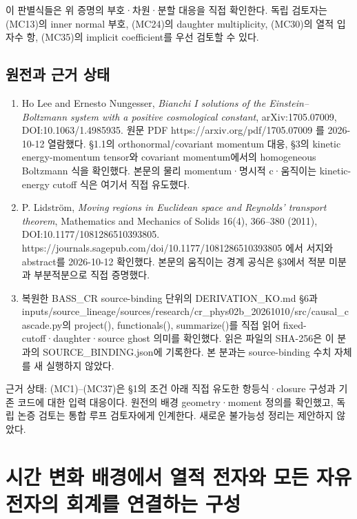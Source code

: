 이 판별식들은 위 증명의 부호·차원·분할 대응을 직접 확인한다. 독립 검토자는 (MC13)의 inner normal 부호, (MC24)의 daughter multiplicity, (MC30)의 열적 입자수 항, (MC35)의 implicit coefficient를 우선 검토할 수 있다.

\hypertarget{uxc6d0uxc804uxacfc-uxadfcuxac70-uxc0c1uxd0dc}{%
\subsection{원전과 근거 상태}\label{uxc6d0uxc804uxacfc-uxadfcuxac70-uxc0c1uxd0dc}}

\begin{enumerate}
\def\labelenumi{\arabic{enumi}.}
\tightlist
\item
  Ho Lee and Ernesto Nungesser, \emph{Bianchi I solutions of the Einstein--Boltzmann system with a positive cosmological constant}, arXiv:1705.07009, DOI:10.1063/1.4985935. 원문 PDF https://arxiv.org/pdf/1705.07009 를 2026-10-12 열람했다. §1.1의 orthonormal/covariant momentum 대응, §3의 kinetic energy-momentum tensor와 covariant momentum에서의 homogeneous Boltzmann 식을 확인했다. 본문의 물리 momentum·명시적 c·움직이는 kinetic-energy cutoff 식은 여기서 직접 유도했다.
\item
  P. Lidström, \emph{Moving regions in Euclidean space and Reynolds' transport theorem}, Mathematics and Mechanics of Solids 16(4), 366--380 (2011), DOI:10.1177/1081286510393805. https://journals.sagepub.com/doi/10.1177/1081286510393805 에서 서지와 abstract를 2026-10-12 확인했다. 본문의 움직이는 경계 공식은 §3에서 적분 미분과 부분적분으로 직접 증명했다.
\item
  복원한 BASS\_CR source-binding 단위의 DERIVATION\_KO.md §6과 inputs/source\_lineage/sources/research/cr\_phys02b\_20261010/src/causal\_cascade.py의 project(), functionals(), summarize()를 직접 읽어 fixed-cutoff·daughter·source ghost 의미를 확인했다. 읽은 파일의 SHA-256은 이 분과의 SOURCE\_BINDING.json에 기록한다. 본 분과는 source-binding 수치 자체를 새 실행하지 않았다.
\end{enumerate}

근거 상태: (MC1)--(MC37)은 §1의 조건 아래 직접 유도한 항등식·closure 구성과 기존 코드에 대한 입력 대응이다. 원전의 배경 geometry·moment 정의를 확인했고, 독립 논증 검토는 통합 루프 검토자에게 인계한다. 새로운 불가능성 정리는 제안하지 않았다.

\clearpage

\hypertarget{uxc2dcuxac04-uxbcc0uxd654-uxbc30uxacbduxc5d0uxc11c-uxc5f4uxc801-uxc804uxc790uxc640-uxbaa8uxb4e0-uxc790uxc720uxc804uxc790uxc758-uxd68cuxacc4uxb97c-uxc5f0uxacb0uxd558uxb294-uxad6cuxc131}{%
\section{시간 변화 배경에서 열적 전자와 모든 자유전자의 회계를 연결하는 구성}\label{uxc2dcuxac04-uxbcc0uxd654-uxbc30uxacbduxc5d0uxc11c-uxc5f4uxc801-uxc804uxc790uxc640-uxbaa8uxb4e0-uxc790uxc720uxc804uxc790uxc758-uxd68cuxacc4uxb97c-uxc5f0uxacb0uxd558uxb294-uxad6cuxc131}}

